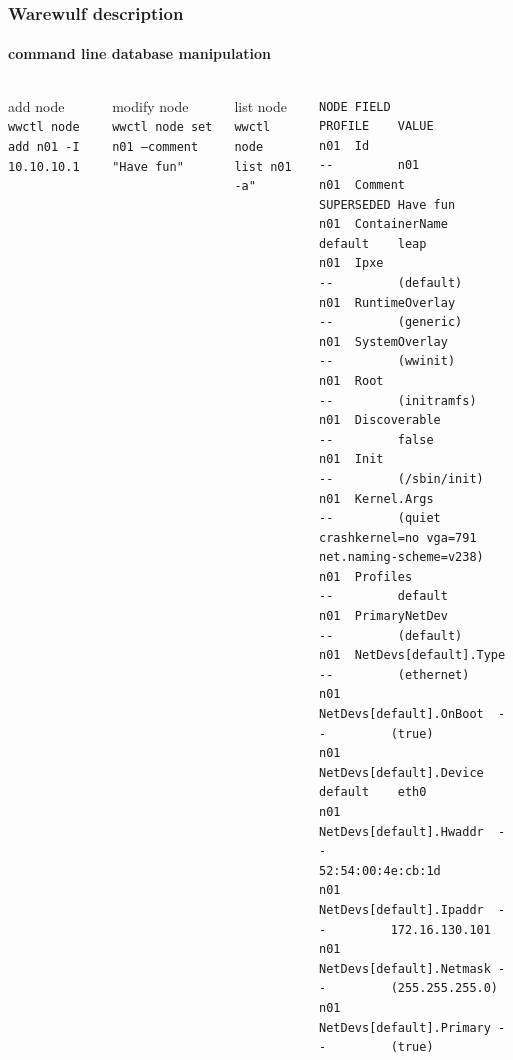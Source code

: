 \documentclass[aspectratio=169]{beamer}
\begin{document}
\begin{frame}[fragile]
\frametitle{Warewulf description}
\framesubtitle{command line database manipulation}
\begin{columns}
\begin{block}{add node}
\texttt{wwctl node add n01 -I 10.10.10.1}
\end{block}
\begin{block}{modify node}
\texttt{wwctl node set n01 --comment "Have fun"}
\end{block}
\begin{block}{list node}
\texttt{wwctl node list n01 -a"}
\end{block}
\vspace*{3cm}
\begin{lstlisting}[style=mystyle]
NODE FIELD                    PROFILE    VALUE
n01  Id                       --         n01
n01  Comment                  SUPERSEDED Have fun
n01  ContainerName            default    leap
n01  Ipxe                     --         (default)
n01  RuntimeOverlay           --         (generic)
n01  SystemOverlay            --         (wwinit)
n01  Root                     --         (initramfs)
n01  Discoverable             --         false
n01  Init                     --         (/sbin/init)
n01  Kernel.Args              --         (quiet crashkernel=no vga=791 net.naming-scheme=v238)
n01  Profiles                 --         default
n01  PrimaryNetDev            --         (default)
n01  NetDevs[default].Type    --         (ethernet)
n01  NetDevs[default].OnBoot  --         (true)
n01  NetDevs[default].Device  default    eth0
n01  NetDevs[default].Hwaddr  --         52:54:00:4e:cb:1d
n01  NetDevs[default].Ipaddr  --         172.16.130.101
n01  NetDevs[default].Netmask --         (255.255.255.0)
n01  NetDevs[default].Primary --         (true)
\end{lstlisting}
\end{columns}
\end{frame}
\end{document}

